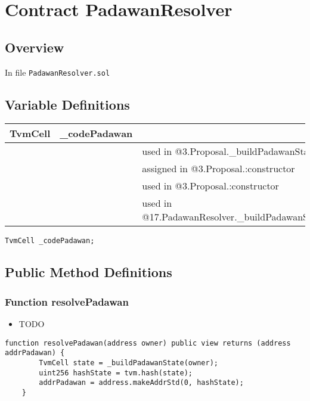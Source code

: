 
\chapter{Contract PadawanResolver}

\minitoc

\section{Overview}


In file {\tt PadawanResolver.sol}

\section{Variable Definitions}


\ifsoltables
\noindent\begin{tabular}{|l|l|p{5cm}|}\hline
TvmCell & \_{}codePadawan &  \\\hline
 & & used in @3.Proposal.\_{}buildPadawanState\\\hline
 & & assigned in @3.Proposal.:constructor\\\hline
 & & used in @3.Proposal.:constructor\\\hline
 & & used in @17.PadawanResolver.\_{}buildPadawanState\\\hline
\end{tabular}
\fi


\begin{lstlisting}[firstnumber=8]
    TvmCell _codePadawan;
\end{lstlisting}

\section{Public Method Definitions}


\subsection{Function resolvePadawan}

\begin{itemize}
\item TODO
\end{itemize}

\begin{lstlisting}[firstnumber=10]
    function resolvePadawan(address owner) public view returns (address addrPadawan) {
        TvmCell state = _buildPadawanState(owner);
        uint256 hashState = tvm.hash(state);
        addrPadawan = address.makeAddrStd(0, hashState);
    }
\end{lstlisting}

